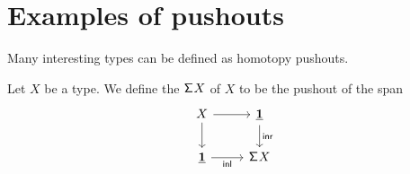 \begin{comment}
The \define{formation rule} for pushouts simply states that for any span $\mathcal{S}\defeq (S,f,g)$ from $A$ to $B$, a type $A\sqcup^{\mathcal{S}} B$ can be formed. We call $A\sqcup^{\mathcal{S}} B$ the \define{canonical pushout} of $\mathcal{S}$. 

\begin{prooftree}
\AxiomC{$\Gamma\vdash f:S\to A$}
\AxiomC{$\Gamma\vdash g:S\to B$}
\BinaryInfC{$\Gamma\vdash A\sqcup^{\mathcal{S}} B~\mathrm{type}$}
\end{prooftree}

The \define{introduction rules} for pushouts provide ways to construct terms of the type $A\sqcup^{\mathcal{S}} B$, and ways to identify some of those.
\begin{prooftree}
\AxiomC{$\Gamma\vdash f:S\to A$}
\AxiomC{$\Gamma\vdash g:S\to B$}
\BinaryInfC{$\Gamma\vdash \inl : A \to A\sqcup^{\mathcal{S}} B$}
\end{prooftree}

\begin{prooftree}
\AxiomC{$\Gamma\vdash f:S\to A$}
\AxiomC{$\Gamma\vdash g:S\to B$}
\BinaryInfC{$\Gamma\vdash \inr : B \to A\sqcup^{\mathcal{S}} B$}
\end{prooftree}

\begin{prooftree}
\AxiomC{$\Gamma\vdash f:S\to A$}
\AxiomC{$\Gamma\vdash g:S\to B$}
\BinaryInfC{$\Gamma\vdash \glue : \inl\circ f \htpy \inr\circ g$}
\end{prooftree}
We assume that $A\sqcup^{\mathcal{S}} B$ is span inductive in the sense of \autoref{thm:pushout_up}. Moreover, if $A$, $B$, and $S$ are types in $\UU$, then we assume that also $A\sqcup^{\mathcal{S}} B$ is in $\UU$. In other words, we assume that the universe is \emph{closed under pushouts}.
\end{comment}

\section{Examples of pushouts}
Many interesting types can be defined as homotopy pushouts. 

\begin{defn}
Let $X$ be a type. We define the  $\mathsf{\Sigma}^{} X$ of $X$ to be the pushout of the span
\begin{equation*}
\begin{tikzcd}
X \arrow[r] \arrow[d] & \unit \arrow[d,"\inr"] \\
\unit \arrow[r,swap,"\inl"] & \susp X 
\end{tikzcd}
\end{equation*}
\end{defn}

